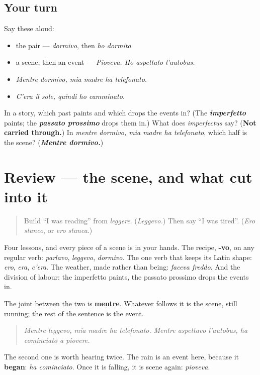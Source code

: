 \subsection*{Your turn}
Say these aloud:

\begin{itemize}
\raggedright
  \item the pair — \emph{dormivo}, then \emph{ho dormito}
  \item a scene, then an event — \emph{Pioveva. Ho aspettato l'autobus.}
  \item \emph{Mentre dormivo, mia madre ha telefonato.}
  \item \emph{C'era il sole, quindi ho camminato.}
\end{itemize}

\begin{tcolorbox}[breakable,colback=teal!4,colframe=teal!35!black,title={Before you move on}]
In a story, which past paints and which drops the events in? (The \emph{\textbf{imperfetto}} paints; the \emph{\textbf{passato prossimo}} drops them in.) What does \emph{imperfectus} say? (\textbf{Not carried through.}) In \emph{mentre dormivo, mia madre ha telefonato}, which half is the scene? (\emph{\textbf{Mentre dormivo.}})
\end{tcolorbox}
\section[(review)]{Review — the scene, and what cut into it}

\label{lesson:IT-C263-ripasso-mentre}



\begin{quote}
Build \textquotedblleft{}I was reading\textquotedblright{} from \emph{leggere}. (\emph{Leggevo.}) Then say \textquotedblleft{}I was tired\textquotedblright{}. (\emph{Ero stanco}, or \emph{ero stanca}.)
\end{quote}

\begin{grammarlens}[title={What you've built}]
Four lessons, and every piece of a scene is in your hands. The recipe, \textbf{-vo}, on any regular verb: \emph{parlavo}, \emph{leggevo}, \emph{dormivo}. The one verb that keeps its Latin shape: \emph{ero}, \emph{era}, \emph{c'era}. The weather, made rather than being: \emph{faceva freddo}. And the division of labour: the imperfetto paints, the passato prossimo drops the events in.

The joint between the two is \textbf{mentre}. Whatever follows it is the scene, still running; the rest of the sentence is the event.

\begin{quote}
\emph{Mentre leggevo, mia madre ha telefonato.} \emph{Mentre aspettavo l'autobus, ha cominciato a piovere.}
\end{quote}

The second one is worth hearing twice. The rain is an event here, because it \textbf{began}: \emph{ha cominciato}. Once it is falling, it is scene again: \emph{pioveva}.
\end{grammarlens}

